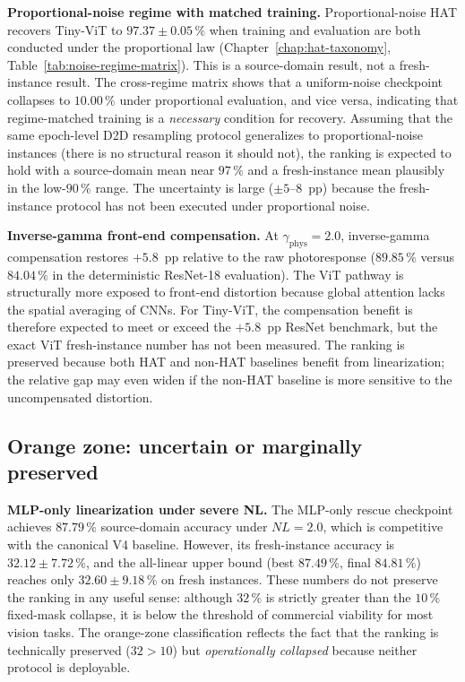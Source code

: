 \textbf{Proportional-noise regime with matched training.}  Proportional-noise HAT recovers Tiny-ViT to $97.37\pm0.05\,\%$ when training and evaluation are both conducted under the proportional law (Chapter~\ref{chap:hat-taxonomy}, Table~\ref{tab:noise-regime-matrix}).  This is a source-domain result, not a fresh-instance result.  The cross-regime matrix shows that a uniform-noise checkpoint collapses to $10.00\,\%$ under proportional evaluation, and vice versa, indicating that regime-matched training is a \emph{necessary} condition for recovery.  Assuming that the same epoch-level D2D resampling protocol generalizes to proportional-noise instances (there is no structural reason it should not), the ranking is expected to hold with a source-domain mean near $97\,\%$ and a fresh-instance mean plausibly in the low-$90\,\%$ range.  The uncertainty is large ($\pm 5$--$8$~pp) because the fresh-instance protocol has not been executed under proportional noise.

\textbf{Inverse-gamma front-end compensation.}  At $\gamma_{\mathrm{phys}}=2.0$, inverse-gamma compensation restores $+5.8$~pp relative to the raw photoresponse ($89.85\,\%$ versus $84.04\,\%$ in the deterministic ResNet-18 evaluation).  The ViT pathway is structurally more exposed to front-end distortion because global attention lacks the spatial averaging of CNNs.  For Tiny-ViT, the compensation benefit is therefore expected to meet or exceed the $+5.8$~pp ResNet benchmark, but the exact ViT fresh-instance number has not been measured.  The ranking is preserved because both HAT and non-HAT baselines benefit from linearization; the relative gap may even widen if the non-HAT baseline is more sensitive to the uncompensated distortion.

\subsection{Orange zone: uncertain or marginally preserved}

\textbf{MLP-only linearization under severe NL.}  The MLP-only rescue checkpoint achieves $87.79\,\%$ source-domain accuracy under $NL=2.0$, which is competitive with the canonical V4 baseline.  However, its fresh-instance accuracy is $32.12\pm7.72\,\%$, and the all-linear upper bound (best $87.49\,\%$, final $84.81\,\%$) reaches only $32.60\pm9.18\,\%$ on fresh instances.  These numbers do not preserve the ranking in any useful sense: although $32\,\%$ is strictly greater than the $10\,\%$ fixed-mask collapse, it is below the threshold of commercial viability for most vision tasks.  The orange-zone classification reflects the fact that the ranking is technically preserved ($32 > 10$) but \emph{operationally collapsed} because neither protocol is deployable.

